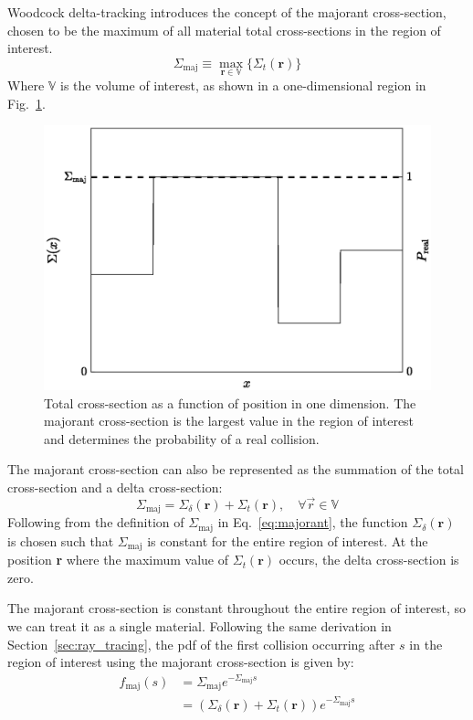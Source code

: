 Woodcock delta-tracking introduces the concept of the majorant
cross-section, chosen to be the maximum of all material total
cross-sections in the region of interest.
\begin{equation}
  \label{eq:majorant}
  \Sigma_\mathrm{maj} \equiv \max_{\mathbf{r} \in \mathbb{V}}\{\Sigma_t(\mathbf{r})\}
\end{equation}
Where $\mathbb{V}$ is the volume of interest, as shown in a
one-dimensional region in Fig.~\ref{fig:sigma_maj}.
\begin{figure}[hbt]
  \centering
  \includegraphics[scale=0.75]{images/sigma_maj}
  \caption{Total cross-section as a function of position in one
    dimension. The majorant cross-section is the largest value in the
    region of interest and determines the probability of a real collision.}
  \label{fig:sigma_maj}
\end{figure}

The majorant
cross-section can also be represented as the summation of the total
cross-section and a delta cross-section:
\begin{equation}
  \label{eq:majorant2}
  \Sigma_\mathrm{maj} = \Sigma_\delta(\mathbf{r}) +
  \Sigma_t(\mathbf{r}), \quad\forall \vec{r} \in \mathbb{V}
\end{equation}
Following from the definition of $\Sigma_\mathrm{maj}$ in
Eq.~\eqref{eq:majorant}, the function $\Sigma_\delta(\mathbf{r})$ is
chosen such that $\Sigma_\mathrm{maj}$ is constant for the entire
region of interest. At the position \textbf{r} where the maximum value
of $\Sigma_t(\mathbf{r})$ occurs, the delta cross-section is zero.

The majorant cross-section is constant throughout the entire region of
interest, so we can treat it as a single material. Following the same derivation in
Section~\ref{sec:ray_tracing}, the \gls{pdf} of the first collision occurring after
$s$ in the region of interest using the majorant cross-section is given by:
\begin{align}
  \label{eq:majorantpdf}
  f_\mathrm{maj}(s) &= \Sigma_\mathrm{maj}e^{-\Sigma_\mathrm{maj}s} \\
  & = (\Sigma_\delta(\mathbf{r}) +
    \Sigma_t(\mathbf{r}))e^{-\Sigma_\mathrm{maj}s}
\end{align}

